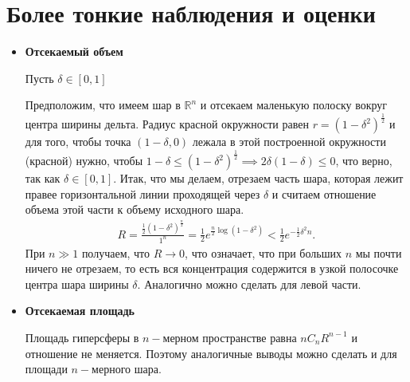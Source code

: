 \documentclass[12pt]{article}
\begin{document}
\section{Более тонкие наблюдения и оценки}
\begin{itemize}
\item {\bf Отсекаемый объем}
\par Пусть $\delta \in [0, 1]$
\begin{center}
\end{center}
Предположим, что имеем шар в $\mathbb{R}^n$ и отсекаем маленькую полоску вокруг центра ширины дельта. Радиус красной окружности равен $r = (1-\delta^2)^{\frac 1 2}$ и для того, чтобы точка $(1-\delta, 0)$ лежала в этой построенной окружности (красной) нужно, чтобы $1 - \delta \le (1-\delta^2)^{\frac 1 2} \implies 2\delta(1-\delta) \le 0$, что верно, так как $\delta \in [0,1]$. Итак, что мы делаем, отрезаем часть шара, которая лежит правее горизонтальной линии проходящей через $\delta$ и считаем отношение объема этой части к объему исходного шара. 
\begin{eqnarray}
R = \frac {\frac 1 2 (1-\delta^2)^{\frac n 2}}{1^n} = \frac 1 2 e^{\frac n 2 \log(1-\delta^2)} < \frac 1 2 e^{- \frac 1 2 \delta^2 n}.
\end{eqnarray}
При $n \gg 1$ получаем, что $R \to 0$, что означает, что при больших $n$ мы почти ничего не отрезаем, то есть вся концентрация содержится в узкой полосочке центра шара ширины $\delta$. Аналогично можно сделать для левой части. 
\item {\bf Отсекаемая площадь} 
\par Площадь гиперсферы в $n-$мерном пространстве равна $nC_n R^{n-1}$ и отношение не меняется. Поэтому аналогичные выводы можно сделать и для площади $n-$мерного шара. 

\end{itemize}
\end{document}
